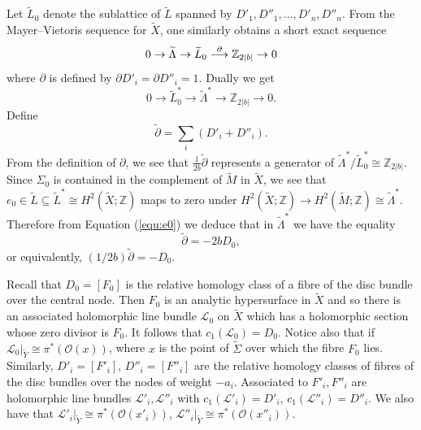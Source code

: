 \documentclass{amsart}
\theoremstyle{definition}
\theoremstyle{remark}
\numberwithin{equation}{section}
\begin{document}
Let $\widetilde{L}_0$ denote the sublattice of $\widetilde{L}$ spanned by $D'_1, D''_1 , \dots , D'_n , D''_n$. From the Mayer--Vietoris sequence for $\widetilde{X}$, one similarly obtains a short exact sequence
\[
0 \to \widetilde{\Lambda} \to \widetilde{L}_0 \buildrel \partial \over \longrightarrow \mathbb{Z}_{2|b|} \to 0
\]
where $\partial$ is defined by $\partial D'_i = \partial D''_i = 1$. Dually we get
\[
0 \to \widetilde{L}^*_0 \to \widetilde{\Lambda}^* \to \mathbb{Z}_{2|b|} \to 0.
\]
Define
\[
\widetilde{\partial} = \sum_i (D'_i + D''_i).
\]
From the definition of $\partial$, we see that $\frac{1}{2b}\widetilde{\partial}$ represents a generator of $\widetilde{\Lambda}^*/\widetilde{L}_0^* \cong \mathbb{Z}_{2|b|}$. Since $\Sigma_0$ is contained in the complement of $\widetilde{M}$ in $\widetilde{X}$, we see that $e_0 \in \widetilde{L} \subseteq \widetilde{L}^* \cong H^2( \widetilde{X} ; \mathbb{Z})$ maps to zero   under $H^2( \widetilde{X} ; \mathbb{Z}) \to H^2(\widetilde{M} ; \mathbb{Z}) \cong \widetilde{\Lambda}^*$. Therefore from Equation (\ref{equ:e0}) we deduce that in $\widetilde{\Lambda}^*$ we have the equality
\[
\widetilde{\partial} = -2b D_0,
\]
or equivalently, $(1/2b)\widetilde{\partial} = -D_0$.

Recall that $D_0 = [F_0]$ is the relative homology class of a fibre of the disc bundle over the central node. Then $F_0$ is an analytic hypersurface in $\widetilde{X}$ and so there is an associated holomorphic line bundle $\mathcal{L}_0$ on $\widetilde{X}$ which has a holomorphic section whose zero divisor is $F_0$. It follows that $c_1(\mathcal{L}_0) = D_0$. Notice also that if $\mathcal{L}_0|_{\widetilde{Y}} \cong \pi^*( \mathcal{O}(x) )$, where $x$ is the point of $\widetilde{\Sigma}$ over which the fibre $F_0$ lies. Similarly, $D'_i = [F'_i]$, $D''_i = [F''_i]$ are the relative homology classes of fibres of the disc bundles over the nodes of weight $-a_i$. Associated to $F'_i, F''_i$ are holomorphic line bundles $\mathcal{L}'_i, \mathcal{L}''_i$ with $c_1(\mathcal{L}'_i) = D'_i$, $c_1(\mathcal{L}''_i) = D''_i$. We also have that $\mathcal{L}'_i|_{\widetilde{Y}} \cong \pi^*( \mathcal{O}(x'_i) )$, $\mathcal{L}''_i|_{\widetilde{Y}} \cong \pi^*( \mathcal{O}(x''_i))$.
\end{document}
